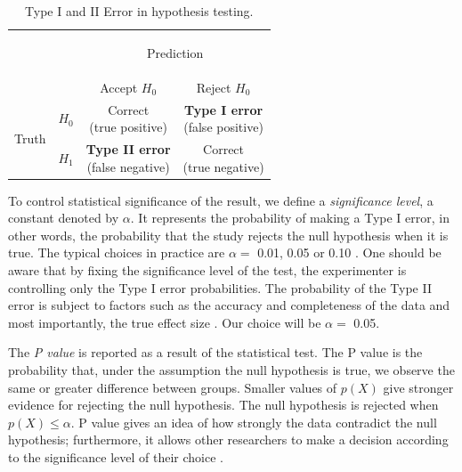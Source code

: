\begin{table}[!htbp]
\centering
\renewcommand{\arraystretch}{2.5}
\begin{tabular}{l|l|c|c|}
\multicolumn{2}{c}{}&\multicolumn{2}{c}{\begin{large}Prediction \end{large}}\\
\cline{3-4}
\multicolumn{2}{c|}{}&Accept $H_{0}$&Reject $H_{0}$\\
\cline{2-4}
\multirow{2}{*}{\begin{large}Truth\end{large}}& \textbf{$H_{0}$} & \shortstack{Correct\\(true positive)} & \shortstack{\textbf{Type I error}\\(false positive)}\\
\cline{2-4}
& \textbf{$H_{1}$} & \shortstack{\textbf{Type II error}\\(false negative)} & \shortstack{Correct\\(true negative)} \\
\cline{2-4}
\end{tabular}
\caption{Type I and II Error in hypothesis testing.}
\label{tab:hypothesis_testing_errors}
\end{table}

To control statistical significance of the result, we define a \textit{significance level}, a constant denoted by $\alpha$. It represents the probability  of making a Type I error, in other words, the probability that the study rejects the null hypothesis when it is true. The typical choices in practice are $\alpha =$ 0.01, 0.05 or 0.10 \cite{casella}. One should be aware that by fixing the significance level of the test, the experimenter is controlling only the Type I error probabilities. The probability of the Type II error is subject to factors such as the accuracy and completeness of the data and most importantly, the true effect size \cite{sham_purcell}. Our choice will be $\alpha =$ 0.05.

The \textit{P value} is reported as a result of the statistical test. The P value is the probability that, under the assumption the null hypothesis is true, we observe the same or greater difference between groups. Smaller values of $p(X)$ give stronger evidence for rejecting the null hypothesis. The null hypothesis is rejected when $p(X) \leq \alpha$. P value gives an idea of how strongly the data contradict the null hypothesis; furthermore, it allows other researchers to make a decision according to the significance level of their choice \cite{pvalue, sham_purcell, lehmann}.

